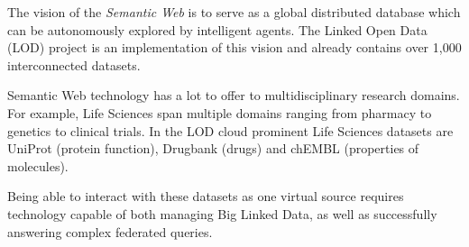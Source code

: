 
The vision of the \emph{Semantic Web} is to serve as a global distributed database which can be autonomously explored by intelligent agents. The Linked Open Data (LOD) project is an implementation of this vision and already contains over 1,000 interconnected datasets. 

Semantic Web technology has a lot to offer to multidisciplinary research domains.
For example, Life Sciences span multiple domains ranging from pharmacy to genetics to clinical trials. In the LOD cloud prominent Life Sciences datasets are 
UniProt (protein function), Drugbank (drugs) and chEMBL (properties of molecules).

Being able to interact with these datasets as one virtual source requires technology capable of both managing Big Linked Data, as well as successfully answering complex federated queries.


